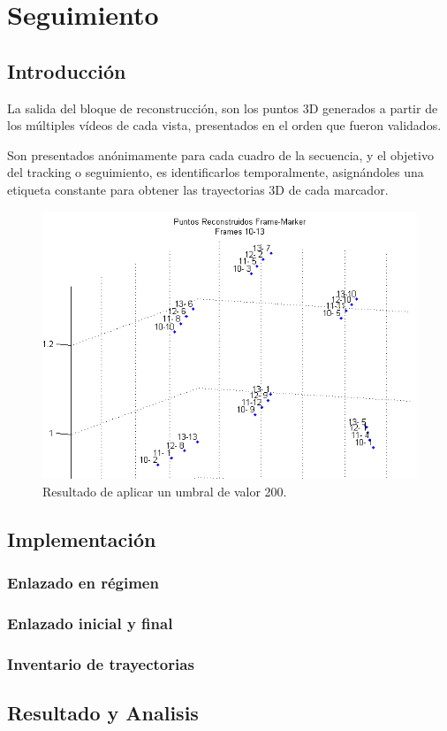 \section{Seguimiento}

\subsection{Introducción}

La salida del bloque de reconstrucción, son los puntos 3D generados a partir de los múltiples vídeos de cada vista, presentados en el orden que fueron validados.

Son presentados anónimamente para cada cuadro de la secuencia, y el objetivo del tracking o seguimiento, es identificarlos temporalmente, asignándoles una etiqueta constante para obtener las trayectorias 3D de cada marcador.

\begin{figure}[hbt]
\begin{center}
\includegraphics[scale=0.8]{img/Tracking/00_Salida_Reconstruccion}
\end{center}
\caption{Resultado de aplicar un umbral de valor 200.}
\label{reconstr_00}
\end{figure}

\subsection{Implementación}



\subsubsection{Enlazado en régimen}



\subsubsection{Enlazado inicial y final}



\subsubsection{Inventario de trayectorias}



\subsection{Resultado y Analisis}


